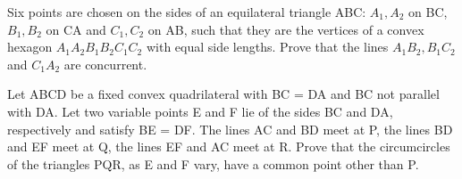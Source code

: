 \item Six points are chosen on the sides of an equilateral triangle ABC: $A_1, A_2$ on BC, $B_1, B_2$ on CA and $C_1, C_2$ on AB, such that they are the vertices of a convex hexagon $A_1A_2B_1B_2C_1C_2$ with equal side lengths. Prove that the lines $A_1 B_2, B_1 C_2$ and $C_1 A_2$ are concurrent.

\item Let ABCD be a fixed convex quadrilateral with BC = DA and BC not parallel with DA. Let two variable points E and F lie of the sides BC and DA, respectively and satisfy BE = DF. The lines AC and BD meet at P, the lines BD and EF meet at Q, the lines EF and AC meet at R.
Prove that the circumcircles of the triangles PQR, as E and F vary, have a common point other than P.


    
   